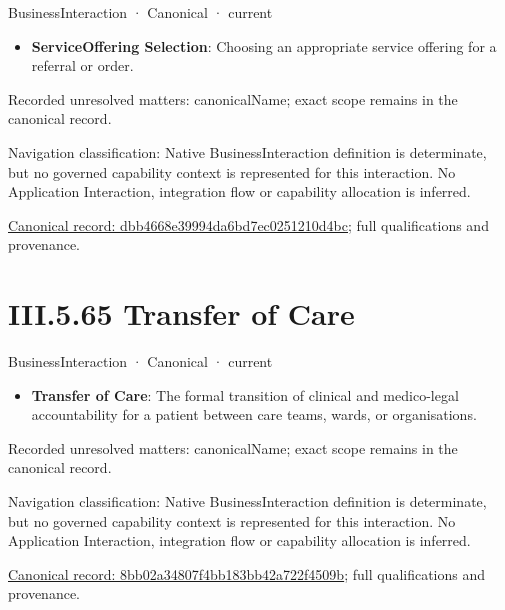 \label{element:dbb4668e39994da6bd7ec0251210d4bc}
{\small BusinessInteraction · Canonical · current}\par

\begin{itemize}


\item \textbf{ServiceOffering Selection}: Choosing an appropriate service offering for a referral or order.

\end{itemize}

{\small Recorded unresolved matters: canonicalName; exact scope remains in the canonical record.}\par
{\small Navigation classification: Native BusinessInteraction definition is determinate, but no governed capability context is represented for this interaction. No Application Interaction, integration flow or capability allocation is inferred.}\par
{\footnotesize \href{../../../../../../../continuum/business/business-interaction/dbb4668e39994da6bd7ec0251210d4bc.md}{Canonical record: dbb4668e39994da6bd7ec0251210d4bc}; full qualifications and provenance.}\par
\section*{III.5.65 Transfer of Care}
\label{navigation:III.5.65}

\label{element:8bb02a34807f4bb183bb42a722f4509b}
{\small BusinessInteraction · Canonical · current}\par

\begin{itemize}


\item \textbf{Transfer of Care}: The formal transition of clinical and medico-legal accountability for a patient between care teams, wards, or organisations.

\end{itemize}

{\small Recorded unresolved matters: canonicalName; exact scope remains in the canonical record.}\par
{\small Navigation classification: Native BusinessInteraction definition is determinate, but no governed capability context is represented for this interaction. No Application Interaction, integration flow or capability allocation is inferred.}\par
{\footnotesize \href{../../../../../../../continuum/business/business-interaction/8bb02a34807f4bb183bb42a722f4509b.md}{Canonical record: 8bb02a34807f4bb183bb42a722f4509b}; full qualifications and provenance.}\par
